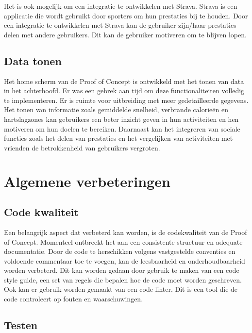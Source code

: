 \vspace{1cm}

Het is ook mogelijk om een integratie te ontwikkelen met Strava. Strava is een applicatie die wordt gebruikt door sporters om hun prestaties bij te houden. Door een integratie te ontwikkelen met Strava kan de gebruiker zijn/haar prestaties delen met andere gebruikers. Dit kan de gebruiker motiveren om te blijven lopen.

\subsection{Data tonen}

Het home scherm van de Proof of Concept is ontwikkeld met het tonen van data in het achterhoofd. Er was een gebrek aan tijd om deze functionaliteiten volledig te implementeren. Er is ruimte voor uitbreiding met meer gedetailleerde gegevens. Het tonen van informatie zoals gemiddelde snelheid, verbrande calorieën en hartslagzones kan gebruikers een beter inzicht geven in hun activiteiten en hen motiveren om hun doelen te bereiken. Daarnaast kan het integreren van sociale functies zoals het delen van prestaties en het vergelijken van activiteiten met vrienden de betrokkenheid van gebruikers vergroten.

\section{Algemene verbeteringen}

\subsection{Code kwaliteit}

Een belangrijk aspect dat verbeterd kan worden, is de codekwaliteit van de Proof of Concept. Momenteel ontbreekt het aan een consistente structuur en adequate documentatie. Door de code te herschikken volgens vastgestelde conventies en voldoende commentaar toe te voegen, kan de leesbaarheid en onderhoudbaarheid worden verbeterd.  Dit kan worden gedaan door gebruik te maken van een code style guide, een set van regels die bepalen hoe de code moet worden geschreven. Ook kan er gebruik worden gemaakt van een code linter. Dit is een tool die de code controleert op fouten en waarschuwingen.

\subsection{Testen}

